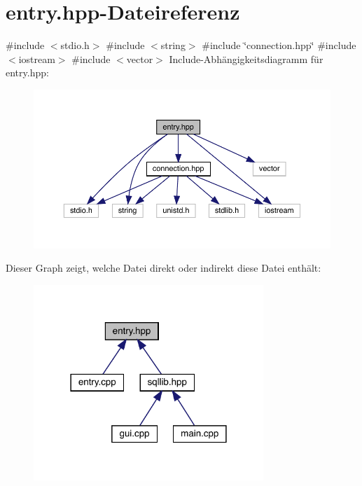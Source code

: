 \section{entry.\+hpp-\/\+Dateireferenz}
\label{entry_8hpp}
{\ttfamily \#include $<$stdio.\+h$>$}\newline
{\ttfamily \#include $<$string$>$}\newline
{\ttfamily \#include \char`\"{}connection.\+hpp\char`\"{}}\newline
{\ttfamily \#include $<$iostream$>$}\newline
{\ttfamily \#include $<$vector$>$}\newline
Include-\/\+Abhängigkeitsdiagramm für entry.\+hpp\+:\nopagebreak
\begin{figure}[H]
\begin{center}
\leavevmode
\includegraphics[width=350pt]{entry_8hpp__incl}
\end{center}
\end{figure}
Dieser Graph zeigt, welche Datei direkt oder indirekt diese Datei enthält\+:\nopagebreak
\begin{figure}[H]
\begin{center}
\leavevmode
\includegraphics[width=246pt]{entry_8hpp__dep__incl}
\end{center}
\end{figure}
